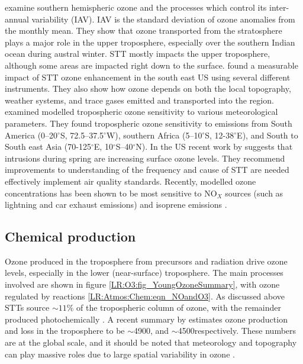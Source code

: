     \textcite{Liu2017} examine southern hemispheric ozone and the processes which control its inter-annual variability (IAV).
    IAV is the standard deviation of ozone anomalies from the monthly mean.
    They show that ozone transported from the stratosphere plays a major role in the upper troposphere, especially over the southern Indian ocean during austral winter.
    STT mostly impacts the upper troposphere, although some areas are impacted right down to the surface.
    \textcite{Kuang2017} found a measurable impact of STT ozone enhancement in the south east US using several different instruments. 
    They also show how ozone depends on both the local topography, weather systems, and trace gases emitted and transported into the region.
    \textcite{Liu2017} examined modelled tropospheric ozone sensitivity to various meteorological parameters.
    They found tropospheric ozone sensitivity to emissions from South America (0--20$^{\circ}$S, 72.5--37.5$^{\circ}$W), southern Africa (5--10$^{\circ}$S, 12-38$^{\circ}$E), and South to South east Asia (70-125$^{\circ}$E, 10$^{\circ}$S--40$^{\circ}$N).
    In the US recent work by \textcite{Lin2015} suggests that intrusions during spring are increasing surface ozone levels.
    They recommend improvements to understanding of the frequency and cause of STT are needed effectively implement air quality standards.
    Recently, modelled ozone concentrations has been shown to be most sensitive to NO$_X$ sources (such as lightning and car exhaust emissions) and isoprene emissions \parencite{Christian2018}.
    
    
    
  \subsection{Chemical production}
    
    Ozone produced in the troposphere from precursors and radiation drive ozone levels, especially in the lower (near-surface) troposphere.
    The main processes involved are shown in figure \ref{LR:O3:fig_YoungOzoneSummary}, with ozone regulated by reactions \ref{LR:Atmos:Chem:eqn_NOandO3}.
    As discussed above STTs source $\sim 11\%$ of the tropospheric column of ozone, with the remainder produced photochemically \parencite{Monks2015}.
    A recent summary by \textcite{Young2018} estimates ozone production and loss in the troposphere to be $\sim$4900\tgpyr, and $\sim$4500\tgpyr respectively. 
    These numbers are at the global scale, and it should be noted that meteorology and topography can play massive roles due to large spatial variability in ozone \parencite[eg.][]{Kuang2017}.
    
